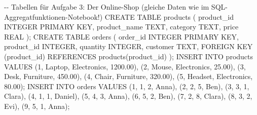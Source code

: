 \documentclass[
  nswissgerman,
  a4paper,
  DIV=11,
  numbers=noendperiod,
  ngerman]{scrreprt}
\newenvironment{Shaded}{\begin{snugshade}}{\end{snugshade}}
\newcommand{\StringTok}[1]{\textcolor[rgb]{0.13,0.47,0.30}{#1}}
\begin{document}
\begin{Shaded}
\begin{Highlighting}[numbers=left,,]
\StringTok{{-}{-} Tabellen für Aufgabe 3: Der Online{-}Shop (gleiche Daten wie im SQL{-}Aggregatfunktionen{-}Notebook!)}
\StringTok{CREATE TABLE products (}
\StringTok{    product\_id   INTEGER PRIMARY KEY,}
\StringTok{    product\_name TEXT,}
\StringTok{    category     TEXT,}
\StringTok{    price        REAL}
\StringTok{);}
\StringTok{CREATE TABLE orders (}
\StringTok{    order\_id    INTEGER PRIMARY KEY,}
\StringTok{    product\_id  INTEGER,}
\StringTok{    quantity    INTEGER,}
\StringTok{    customer    TEXT,}
\StringTok{    FOREIGN KEY (product\_id) REFERENCES products(product\_id)}
\StringTok{);}
\StringTok{INSERT INTO products VALUES}
\StringTok{    (1, \textquotesingle{}Laptop\textquotesingle{},  \textquotesingle{}Electronics\textquotesingle{}, 1200.00),}
\StringTok{    (2, \textquotesingle{}Mouse\textquotesingle{},   \textquotesingle{}Electronics\textquotesingle{},   25.00),}
\StringTok{    (3, \textquotesingle{}Desk\textquotesingle{},    \textquotesingle{}Furniture\textquotesingle{},    450.00),}
\StringTok{    (4, \textquotesingle{}Chair\textquotesingle{},   \textquotesingle{}Furniture\textquotesingle{},    320.00),}
\StringTok{    (5, \textquotesingle{}Headset\textquotesingle{}, \textquotesingle{}Electronics\textquotesingle{},   80.00);}
\StringTok{INSERT INTO orders VALUES}
\StringTok{    (1, 1, 2, \textquotesingle{}Anna\textquotesingle{}),}
\StringTok{    (2, 2, 5, \textquotesingle{}Ben\textquotesingle{}),}
\StringTok{    (3, 3, 1, \textquotesingle{}Clara\textquotesingle{}),}
\StringTok{    (4, 1, 1, \textquotesingle{}Daniel\textquotesingle{}),}
\StringTok{    (5, 4, 3, \textquotesingle{}Anna\textquotesingle{}),}
\StringTok{    (6, 5, 2, \textquotesingle{}Ben\textquotesingle{}),}
\StringTok{    (7, 2, 8, \textquotesingle{}Clara\textquotesingle{}),}
\StringTok{    (8, 3, 2, \textquotesingle{}Evi\textquotesingle{}),}
\StringTok{    (9, 5, 1, \textquotesingle{}Anna\textquotesingle{});}


\end{Highlighting}
\end{Shaded}
\end{document}
